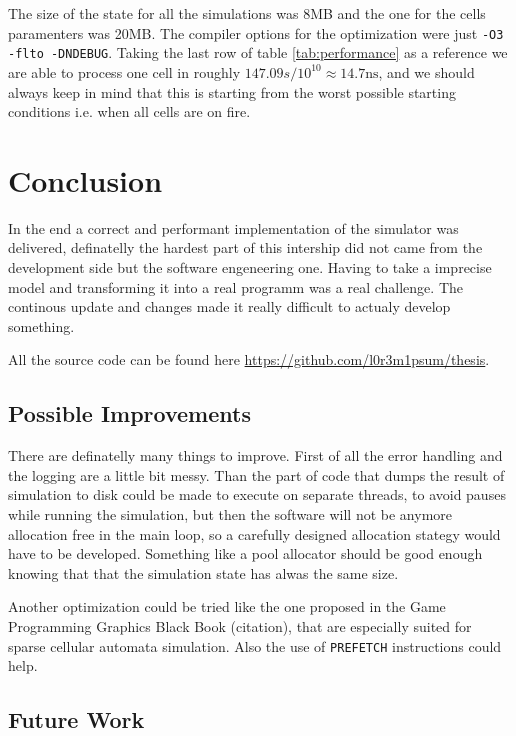 \documentclass[Lau]{sapthesis} %
\begin{document}
The size of the state for all the simulations  was 8MB and the one for the cells
paramenters was 20MB. The compiler options for the optimization were just
\texttt{-O3 -flto -DNDEBUG}. Taking the last row of table \ref{tab:performance}
as a reference we are able to process one cell in roughly $147.09s/10^{10}
\approx 14.7\textrm{ns}$, and we should always keep in mind that this is
starting from the worst possible starting conditions i.e. when all cells are on
fire.


\section{Conclusion}

In the end a correct and performant implementation of the simulator was
delivered, definatelly the hardest part of this intership did not came from the
development side but the software engeneering one. Having to take a imprecise
model and transforming it into a real programm was a real challenge. The
continous update and changes made it really difficult to actualy develop
something.

All the source code can be found here
\url{https://github.com/l0r3m1psum/thesis}.

\subsection{Possible Improvements}

There are definatelly many things to improve. First of all the error handling
and the logging are a little bit messy. Than the part of code that dumps the
result of simulation to disk could be made to execute on separate threads, to
avoid pauses while running the simulation, but then the software will not be
anymore allocation free in the main loop, so a carefully designed allocation
stategy would have to be developed. Something like a pool allocator should be
good enough knowing that that the simulation state has alwas the same size.

Another optimization could be tried like the one proposed in the Game
Programming Graphics Black Book (citation), that are especially suited for
sparse cellular automata simulation. Also the use of \texttt{PREFETCH}
instructions could help.

\subsection{Future Work}
\end{document}
